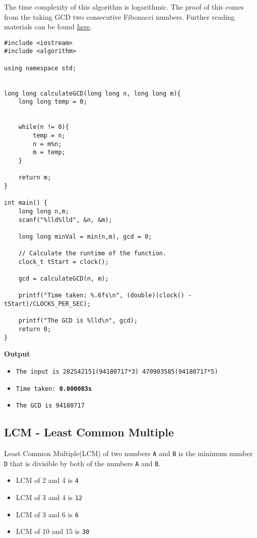 \documentclass[12pt]{article}
\begin{document}
The time complexity of this algorithm is logarithmic. The proof of this comes from the taking GCD two consecutive Fibonacci numbers. Further reading materials can be found  \href{http://www.sci.brooklyn.cuny.edu/~amotz/BC-ALGORITHMS/PRESENTATIONS/gcd.pdf}{here}.  
\clearpage

\begin{verbatim}
#include <iostream>
#include <algorithm>

using namespace std;


long long calculateGCD(long long n, long long m){
    long long temp = 0;
    
    
    while(n != 0){
        temp = n;
        n = m%n;
        m = temp;
    }
    
    return m;
}

int main() {
    long long n,m;
    scanf("%lld%lld", &n, &m);
    
    long long minVal = min(n,m), gcd = 0;
    
    // Calculate the runtime of the function.
    clock_t tStart = clock();
    
    gcd = calculateGCD(n, m);
    
    printf("Time taken: %.6fs\n", (double)(clock() - tStart)/CLOCKS_PER_SEC);
    
    printf("The GCD is %lld\n", gcd);
    return 0;
}
\end{verbatim}
\textbf{Output}

\begin{itemize}
  \item \texttt{The input is 282542151(94180717*3) 470903585(94180717*5)} 
  \item \texttt{Time taken: \textbf{0.000003s}} 
  \item \texttt{The GCD is 94180717}
\end{itemize}

\clearpage

\subsection{LCM - Least Common Multiple}
Least Common Multiple(LCM) of two numbers \texttt{A} and \texttt{B} is the minimum number \texttt{D} that is divisible by both of the numbers \texttt{A} and \texttt{B}. 

\begin{itemize}
  \item LCM of 2 and 4 is \texttt{4} 
  \item LCM of 3 and 4 is \texttt{12} 
  \item LCM of 3 and 6 is \texttt{6} 
  \item LCM of 10 and 15 is \texttt{30} 
\end{itemize}
\end{document}
